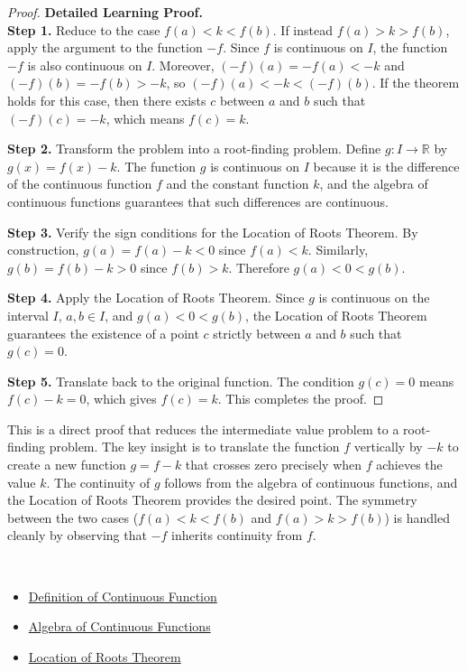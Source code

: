 \begin{proof}
\textbf{Detailed Learning Proof.}~\\

\textbf{Step 1.} Reduce to the case $f(a) < k < f(b)$. If instead $f(a) > k > f(b)$, apply the argument to the function $-f$. Since $f$ is continuous on $I$, the function $-f$ is also continuous on $I$. Moreover, $(-f)(a) = -f(a) < -k$ and $(-f)(b) = -f(b) > -k$, so $(-f)(a) < -k < (-f)(b)$. If the theorem holds for this case, then there exists $c$ between $a$ and $b$ such that $(-f)(c) = -k$, which means $f(c) = k$.

\textbf{Step 2.} Transform the problem into a root-finding problem. Define $g : I \to \mathbb{R}$ by $g(x) = f(x) - k$. The function $g$ is continuous on $I$ because it is the difference of the continuous function $f$ and the constant function $k$, and the algebra of continuous functions guarantees that such differences are continuous.

\textbf{Step 3.} Verify the sign conditions for the Location of Roots Theorem. By construction, $g(a) = f(a) - k < 0$ since $f(a) < k$. Similarly, $g(b) = f(b) - k > 0$ since $f(b) > k$. Therefore $g(a) < 0 < g(b)$.

\textbf{Step 4.} Apply the Location of Roots Theorem. Since $g$ is continuous on the interval $I$, $a, b \in I$, and $g(a) < 0 < g(b)$, the Location of Roots Theorem guarantees the existence of a point $c$ strictly between $a$ and $b$ such that $g(c) = 0$.

\textbf{Step 5.} Translate back to the original function. The condition $g(c) = 0$ means $f(c) - k = 0$, which gives $f(c) = k$. This completes the proof.
\end{proof}

\begin{remark*}
This is a direct proof that reduces the intermediate value problem to a root-finding problem. The key insight is to translate the function $f$ vertically by $-k$ to create a new function $g = f - k$ that crosses zero precisely when $f$ achieves the value $k$. The continuity of $g$ follows from the algebra of continuous functions, and the Location of Roots Theorem provides the desired point. The symmetry between the two cases ($f(a) < k < f(b)$ and $f(a) > k > f(b)$) is handled cleanly by observing that $-f$ inherits continuity from $f$.
\end{remark*}

\begin{remark*}[Dependencies]~\\
\begin{itemize}
  \item \hyperref[def:continuous-function]{Definition of Continuous Function}
  \item \hyperref[thm:algebra-continuous-functions]{Algebra of Continuous Functions}
  \item \hyperref[thm:location-roots]{Location of Roots Theorem}
\end{itemize}
\end{remark*}
